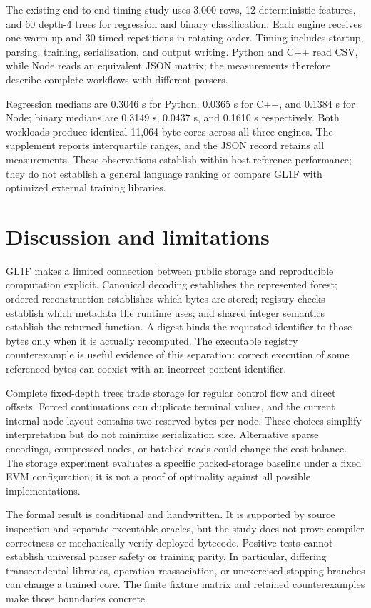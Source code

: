 \documentclass{ledger}
\begin{document}
The existing end-to-end timing study uses 3,000 rows, 12 deterministic
features, and 60 depth-4 trees for regression and binary classification. Each
engine receives one warm-up and 30 timed repetitions in rotating order.
Timing includes startup, parsing, training, serialization, and output writing.
Python and C++ read CSV, while Node reads an equivalent JSON matrix; the
measurements therefore describe complete workflows with different parsers.

Regression medians are 0.3046 s for Python, 0.0365 s for C++, and 0.1384 s for
Node; binary medians are 0.3149 s, 0.0437 s, and 0.1610 s respectively. Both
workloads produce identical 11,064-byte cores across all three engines.
The supplement reports interquartile ranges, and the JSON record retains all
measurements. These observations establish within-host reference performance;
they do not establish a general language ranking or compare GL1F with
optimized external training libraries.

\section{Discussion and limitations}
\label{sec:discussion}

GL1F makes a limited connection between public storage and reproducible
computation explicit. Canonical decoding establishes the represented forest;
ordered reconstruction establishes which bytes are stored; registry checks
establish which metadata the runtime uses; and shared integer semantics
establish the returned function. A digest binds the requested identifier to
those bytes only when it is actually recomputed. The executable registry
counterexample is useful evidence of this separation: correct execution of
some referenced bytes can coexist with an incorrect content identifier.

Complete fixed-depth trees trade storage for regular control flow and direct
offsets. Forced continuations can duplicate terminal values, and the current
internal-node layout contains two reserved bytes per node. These choices
simplify interpretation but do not minimize serialization size. Alternative
sparse encodings, compressed nodes, or batched reads could change the cost
balance. The storage experiment evaluates a specific packed-storage baseline
under a fixed EVM configuration; it is not a proof of optimality against all
possible implementations.

The formal result is conditional and handwritten. It is supported by
source inspection and separate executable oracles, but the study does not
prove compiler correctness or mechanically verify deployed bytecode. Positive
tests cannot establish universal parser safety or training parity. In
particular, differing transcendental libraries, operation reassociation, or
unexercised stopping branches can change a trained core. The finite fixture
matrix and retained counterexamples make those boundaries concrete.
\end{document}
